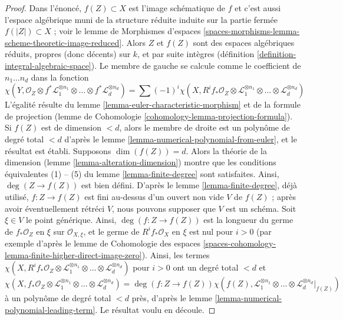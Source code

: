 \begin{proof}
Dans l'énoncé, $f(Z) \subset X$ est l'image schématique de $f$
et c'est aussi l'espace algébrique muni de la structure réduite induite sur la
partie fermée $f(|Z|) \subset X$ ; voir le lemme de Morphismes d'espaces
\ref{spaces-morphisms-lemma-scheme-theoretic-image-reduced}.
Alors $Z$ et $f(Z)$ sont des espaces algébriques réduits, propres (donc décents)
sur $k$, et par suite intègres
(définition \ref{definition-integral-algebraic-space}).
Le membre de gauche se calcule comme le coefficient de $n_1 \ldots n_d$
dans la fonction
$$
\chi(Y, \mathcal{O}_Z \otimes f^*\mathcal{L}_1^{\otimes n_1} \otimes
\ldots \otimes f^*\mathcal{L}_d^{\otimes n_d}) =
\sum (-1)^i
\chi(X, R^if_*\mathcal{O}_Z \otimes
\mathcal{L}_1^{\otimes n_1} \otimes \ldots \otimes
\mathcal{L}_d^{\otimes n_d})
$$
L'égalité résulte du lemme \ref{lemma-euler-characteristic-morphism}
et de la formule de projection
(lemme de Cohomologie \ref{cohomology-lemma-projection-formula}).
Si $f(Z)$ est de dimension $< d$, alors le membre de droite
est un polynôme de degré total $< d$ d'après le
lemme \ref{lemma-numerical-polynomial-from-euler},
et le résultat est établi. Supposons $\dim(f(Z)) = d$. Alors
la théorie de la dimension (lemme \ref{lemma-alteration-dimension}) montre
que les conditions équivalentes (1) -- (5) du
lemme \ref{lemma-finite-degree} sont satisfaites. Ainsi,
$\deg(Z \to f(Z))$ est bien défini.
D'après le lemme \ref{lemma-finite-degree}, déjà utilisé,
$f : Z \to f(Z)$ est fini au-dessus d'un ouvert non vide
$V$ de $f(Z)$ ; après avoir éventuellement rétréci $V$, nous pouvons supposer que
$V$ est un schéma. Soit $\xi \in V$ le point générique.
Ainsi, $\deg(f : Z \to f(Z))$ est la longueur du germe de
$f_*\mathcal{O}_Z$ en $\xi$ sur $\mathcal{O}_{X, \xi}$,
et le germe de $R^if_*\mathcal{O}_X$ en $\xi$ est nul pour $i > 0$
(par exemple d'après le lemme de Cohomologie des espaces
\ref{spaces-cohomology-lemma-finite-higher-direct-image-zero}).
Ainsi, les termes $\chi(X, R^if_*\mathcal{O}_Z \otimes
\mathcal{L}_1^{\otimes n_1} \otimes \ldots \otimes
\mathcal{L}_d^{\otimes n_d})$ pour $i > 0$
ont un degré total $< d$ et
$$
\chi(X, f_*\mathcal{O}_Z \otimes
\mathcal{L}_1^{\otimes n_1} \otimes \ldots \otimes
\mathcal{L}_d^{\otimes n_d})
=
\deg(f : Z \to f(Z)) \chi(f(Z),
\mathcal{L}_1^{\otimes n_1} \otimes \ldots \otimes
\mathcal{L}_d^{\otimes n_d}|_{f(Z)})
$$
à un polynôme de degré total $< d$ près, d'après le
lemme \ref{lemma-numerical-polynomial-leading-term}.
Le résultat voulu en découle.
\end{proof}

